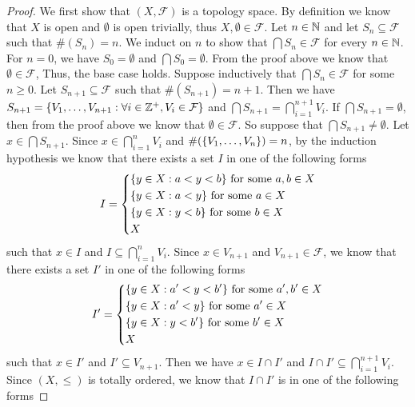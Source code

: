 \begin{proof}
  We first show that \((X, \mathcal{F})\) is a topology space.
  By definition we know that \(X\) is open and \(\emptyset\) is open trivially, thus \(X, \emptyset \in \mathcal{F}\).
  Let \(n \in \mathbb{N}\) and let \(S_n \subseteq \mathcal{F}\) such that \(\#(S_n) = n\).
  We induct on \(n\) to show that \(\bigcap S_n \in \mathcal{F}\) for every \(n \in \mathbb{N}\).
  For \(n = 0\), we have \(S_0 = \emptyset\) and \(\bigcap S_0 = \emptyset\).
  From the proof above we know that \(\emptyset \in \mathcal{F}\), Thus, the base case holds.
  Suppose inductively that \(\bigcap S_n \in \mathcal{F}\) for some \(n \geq 0\).
  Let \(S_{n + 1} \subseteq \mathcal{F}\) such that \(\#(S_{n + 1}) = n + 1\).
  Then we have \(S_{n + 1} = \left\lbrace V_1, \dots, V_{n + 1} : \forall i \in \mathbb{Z}^+, V_i \in \mathcal{F}\right\rbrace\) and \(\bigcap S_{n + 1} = \bigcap_{i = 1}^{n + 1} V_i\).
  If \(\bigcap S_{n + 1} = \emptyset\), then from the proof above we know that \(\emptyset \in \mathcal{F}\).
  So suppose that \(\bigcap S_{n + 1} \neq \emptyset\).
  Let \(x \in \bigcap S_{n + 1}\).
  Since \(x \in \bigcap_{i = 1}^n V_i\) and \(\#(\left\lbrace V_1, \dots, V_n\right\rbrace) = n\), by the induction hypothesis we know that there exists a set \(I\) in one of the following forms
  \[
    I = \begin{dcases}
      \set{y \in X : a < y < b} \text{ for some } a, b \in X \\
      \set{y \in X : a < y} \text{ for some } a \in X        \\
      \set{y \in X : y < b} \text{ for some } b \in X        \\
      X
    \end{dcases}
  \]
  such that \(x \in I\) and \(I \subseteq \bigcap_{i = 1}^n V_i\).
  Since \(x \in V_{n + 1}\) and \(V_{n + 1} \in \mathcal{F}\), we know that there exists a set \(I'\) in one of the following forms
  \[
    I' = \begin{dcases}
      \set{y \in X : a' < y < b'} \text{ for some } a', b' \in X \\
      \set{y \in X : a' < y} \text{ for some } a' \in X          \\
      \set{y \in X : y < b'} \text{ for some } b' \in X          \\
      X
    \end{dcases}
  \]
  such that \(x \in I'\) and \(I' \subseteq V_{n + 1}\).
  Then we have \(x \in I \cap I'\) and \(I \cap I' \subseteq \bigcap_{i = 1}^{n + 1} V_i\).
  Since \((X, \leq)\) is totally ordered, we know that \(I \cap I'\) is in one of the following forms

\end{proof}
